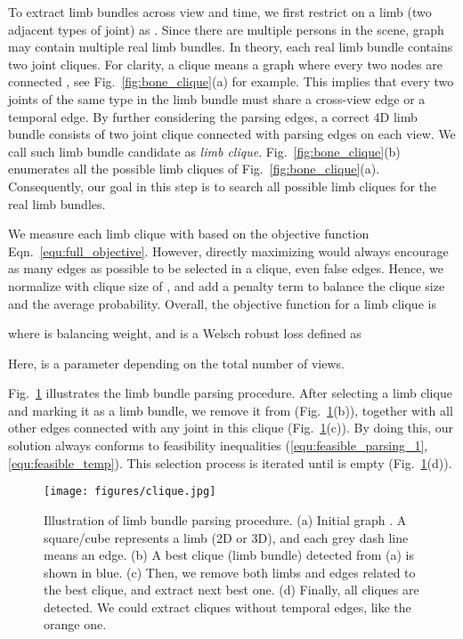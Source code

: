 \documentclass[10pt,twocolumn,letterpaper]{article}
\begin{document}
To extract limb bundles across view and time, we first restrict  on a limb  (two adjacent types of joint) as .
Since there are multiple persons in the scene, graph  may contain multiple real limb bundles. In theory, each real limb bundle contains two joint cliques. For clarity, a clique means a graph where every two nodes are connected \cite{Wilson96introductionto}, see Fig.~\ref{fig:bone_clique}(a) for example. This implies that every two joints of the same type in the limb bundle must share a cross-view edge or a temporal edge. By further considering the parsing edges, a correct 4D limb bundle consists of two joint clique connected with parsing edges on each view. We call such limb bundle candidate as \textit{limb clique}. Fig.~\ref{fig:bone_clique}(b) enumerates all the possible limb cliques of Fig.~\ref{fig:bone_clique}(a). Consequently, our goal in this step is to search
all possible limb cliques  for the real limb bundles.


We measure each limb clique with  based on the objective function Eqn.~\ref{equ:full_objective}.
However, directly maximizing  would always encourage as many edges as possible to be selected in a clique, even false edges.
Hence, we normalize  with clique size  of , and add a penalty term to balance the clique size and the average probability.
Overall, the objective function for a limb clique is

where  is balancing weight, and  is a Welsch robust loss\cite{dennis1978techniques,barron2019general} defined as

Here,  is a parameter depending on the total number of views.

Fig.~\ref{fig:clique} illustrates the limb bundle parsing procedure. After selecting a limb clique and marking it as a limb bundle, we remove it from  (Fig.~\ref{fig:clique}(b)), together with all other edges connected with any joint in this clique (Fig.~\ref{fig:clique}(c)). By doing this, our solution always conforms to feasibility inequalities (\ref{equ:feasible_parsing_1},\ref{equ:feasible_temp}).
This selection process is iterated until  is empty (Fig.~\ref{fig:clique}(d)).



\begin{figure}
    \centering
    \texttt{[image: figures/clique.jpg]}
\caption{Illustration of limb bundle parsing procedure.
    (a) Initial graph . A square/cube represents a limb (2D or 3D), and each grey dash line means an edge.
    (b) A best clique (limb bundle) detected from (a) is shown in blue.
    (c) Then, we remove both limbs and edges related to the best clique, and extract next best one.
    (d) Finally, all cliques are detected. We could extract cliques without temporal edges, like the orange one.}
    \label{fig:clique}
    \vspace{-3mm}
\end{figure}
\end{document}
